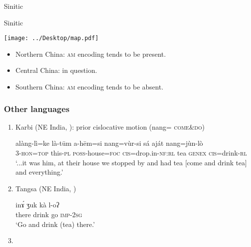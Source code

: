 \documentclass[xcolor=table]{beamer}
\newcommand{\rouge}[1]{{\color{red}#1}}
\begin{document}
\begin{frame}{Sinitic}
\end{frame}

\begin{frame}{Sinitic}
 \begin{minipage}[c]{.46\linewidth}
\texttt{[image: ../Desktop/map.pdf]}  
   \end{minipage} \hfill
   \begin{minipage}[c]{.46\linewidth}
   
   \begin{itemize}
\item Northern China: \textsc{am} encoding tends to be present.
\item Central China: in question.
\item Southern China: \textsc{am} encoding tends to be absent.
\end{itemize}
\end{minipage}
\end{frame}


\begin{frame} 
\frametitle{Other languages}
\begin{enumerate}
\item<1-> Karbi (NE India, \citealt{konnerth15cisloc}): prior cislocative motion (\rouge{nang}= \textsc{come\&do})
\begin{exe}
\ex 
\gll alàng-lì=ke là-tūm a-hēm=si \rouge{nang}=vùr-si sá aját \rouge{nang}=jùn-lò \\
 3-\textsc{hon}=\textsc{top} this-\textsc{pl} \textsc{poss}-house=\textsc{foc} \rouge{\textsc{cis}}=drop.in-\textsc{nf}:\textsc{rl} tea \textsc{genex} \rouge{\textsc{cis}}=drink-\textsc{rl} \\
 \glt `...it was him, at their house we stopped by and had tea [\rouge{come} and drink tea] and everything.'
\end{exe}
 \item<2-> Tangsa (NE India, \citealt[311-312]{boro17hakhun})
 \begin{exe}
\ex 
\gll   inɤ́ ʒuk \rouge{kà} l-oʔ \\
there drink \rouge{go} \textsc{imp}-\textsc{2sg} \\
\glt ‘\rouge{Go} and drink (tea) there.’
\end{exe}
  \item<3->   \citet{Jenny16grammar}
   \end{enumerate}
\end{frame}  
\end{document}
